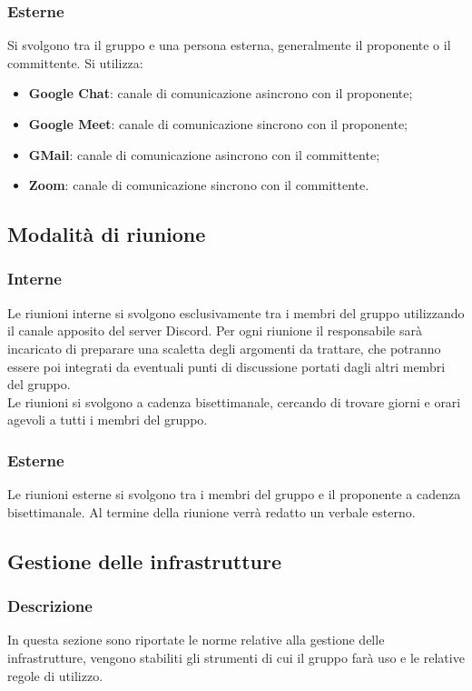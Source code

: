 \subsubsection{Esterne}
Si svolgono tra il gruppo e una persona esterna, generalmente il proponente
o il committente. Si utilizza:
\begin{itemize}
    \item \textbf{Google Chat}: canale di comunicazione asincrono con il proponente;
    \item \textbf{Google Meet}: canale di comunicazione sincrono con il proponente;
    \item \textbf{GMail}: canale di comunicazione asincrono con il committente;
    \item \textbf{Zoom}: canale di comunicazione sincrono con il committente.
\end{itemize}

\subsection{Modalità di riunione}
\subsubsection{Interne}
Le riunioni interne si svolgono esclusivamente tra i membri del gruppo
utilizzando il canale apposito del server Discord. Per ogni riunione il
responsabile sarà incaricato di preparare una scaletta degli argomenti da
trattare, che potranno essere poi integrati da eventuali punti di discussione
portati dagli altri membri del gruppo.\\ Le riunioni si svolgono a cadenza
bisettimanale, cercando di trovare giorni e orari agevoli a tutti i membri del
gruppo.

\subsubsection{Esterne}
Le riunioni esterne si svolgono tra i membri del gruppo e il proponente a
cadenza bisettimanale. Al termine della riunione verrà redatto un verbale
esterno.

\subsection{Gestione delle infrastrutture}
\subsubsection{Descrizione}
In questa sezione sono riportate le norme relative alla gestione delle
infrastrutture, vengono stabiliti gli strumenti di cui il gruppo farà uso e le
relative regole di utilizzo.

